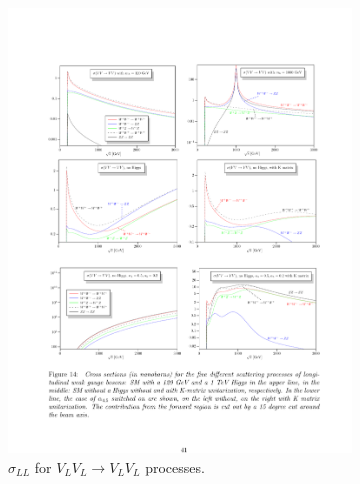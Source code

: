 \begin{figure}[!htbp]
  \begin{subfigure}{.49\textwidth}
    \centering
    \includegraphics[width=.99\linewidth]{figures/Theory/VBS_NoHiggs.pdf}  
    \caption{$\sigma_{LL}$ for $V_L V_L \rightarrow V_L V_L$ processes.}
    \label{fig:VBS_XS}
  \end{subfigure}
  \begin{subfigure}{.49\textwidth}
    \centering

\end{subfigure}
\end{figure}
